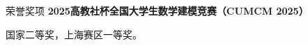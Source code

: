 \begin{rubric}{荣誉奖项}
\entry*[2025]%
	\textbf{2025高教社杯全国大学生数学建模竞赛（CUMCM 2025）}\par
	国家二等奖，上海赛区一等奖。
\end{rubric}
